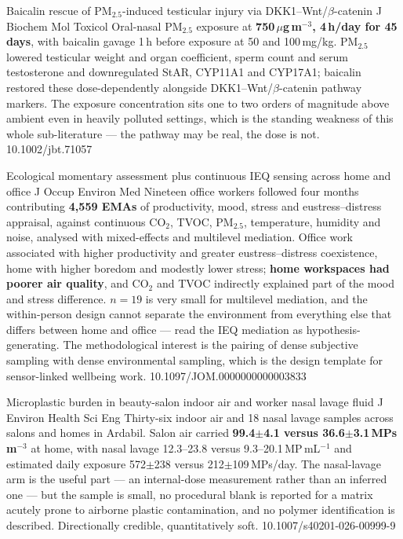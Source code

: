 \documentclass[10pt]{article}
\begin{document}
{Baicalin rescue of PM$_{2.5}$-induced testicular injury via DKK1--Wnt/$\beta$-catenin}
{J Biochem Mol Toxicol}
{Oral-nasal PM$_{2.5}$ exposure at \textbf{750\,$\mu$g\,m$^{-3}$, 4\,h/day for 45 days},
with baicalin gavage 1\,h before exposure at 50 and 100\,mg/kg. PM$_{2.5}$ lowered
testicular weight and organ coefficient, sperm count and serum testosterone and
downregulated StAR, CYP11A1 and CYP17A1; baicalin restored these dose-dependently alongside
DKK1--Wnt/$\beta$-catenin pathway markers. The exposure concentration sits one to two
orders of magnitude above ambient even in heavily polluted settings, which is the standing
weakness of this whole sub-literature --- the pathway may be real, the dose is not.}
{10.1002/jbt.71057}


{Ecological momentary assessment plus continuous IEQ sensing across home and office}
{J Occup Environ Med}
{Nineteen office workers followed four months contributing \textbf{4{,}559 EMAs} of
productivity, mood, stress and eustress--distress appraisal, against continuous CO$_2$,
TVOC, PM$_{2.5}$, temperature, humidity and noise, analysed with mixed-effects and
multilevel mediation. Office work associated with higher productivity and greater
eustress--distress coexistence, home with higher boredom and modestly lower stress;
\textbf{home workspaces had poorer air quality}, and CO$_2$ and TVOC indirectly explained
part of the mood and stress difference. $n=19$ is very small for multilevel mediation, and
the within-person design cannot separate the environment from everything else that differs
between home and office --- read the IEQ mediation as hypothesis-generating. The
methodological interest is the pairing of dense subjective sampling with dense
environmental sampling, which is the design template for sensor-linked wellbeing work.}
{10.1097/JOM.0000000000003833}

{Microplastic burden in beauty-salon indoor air and worker nasal lavage fluid}
{J Environ Health Sci Eng}
{Thirty-six indoor air and 18 nasal lavage samples across salons and homes in Ardabil.
Salon air carried \textbf{99.4$\pm$4.1 versus 36.6$\pm$3.1\,MPs\,m$^{-3}$} at home, with
nasal lavage 12.3--23.8 versus 9.3--20.1\,MP\,mL$^{-1}$ and estimated daily exposure
572$\pm$238 versus 212$\pm$109\,MPs/day. The nasal-lavage arm is the useful part --- an
internal-dose measurement rather than an inferred one --- but the sample is small, no
procedural blank is reported for a matrix acutely prone to airborne plastic contamination,
and no polymer identification is described. Directionally credible, quantitatively soft.}
{10.1007/s40201-026-00999-9}
\end{document}

